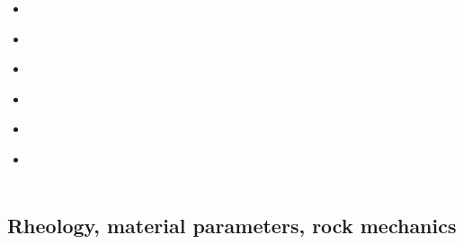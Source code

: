 \begin{scriptsize}
\begin{itemize}
\item[\twothousandone] 
\textcite{istv01} \\
\item[\twothousandfour] 
\textcite{istt04} \\
\item[\twothousandfive] 
\textcite{koma05} \\
\item[\twothousandtwelve] 
\textcite{lofg12} \\
\item[\twothousandeighteen] 
\textcite{lojm18} \\
\item[\twothousandtwenty] 
\textcite{sctc20} \\
\textcite{taas20} \\
\end{itemize}
\end{scriptsize}

\subsection{Rheology, material parameters, rock mechanics}

